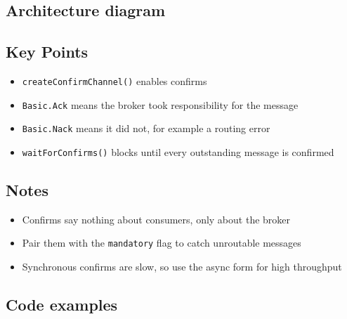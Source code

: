 \documentclass[11pt,a4paper]{article}
\begin{document}

\subsection{Architecture diagram}

\subsection*{Key Points}

\begin{itemize}\itemsep2pt
  \item \lstinline|createConfirmChannel()| enables confirms
  \item \lstinline|Basic.Ack| means the broker took responsibility for the message
  \item \lstinline|Basic.Nack| means it did not, for example a routing error
  \item \lstinline|waitForConfirms()| blocks until every outstanding message is confirmed
\end{itemize}

\subsection*{Notes}

\begin{itemize}\itemsep2pt
  \item Confirms say nothing about consumers, only about the broker
  \item Pair them with the \lstinline|mandatory| flag to catch unroutable messages
  \item Synchronous confirms are slow, so use the async form for high throughput
\end{itemize}

\newpage
\subsection{Code examples}
\end{document}
